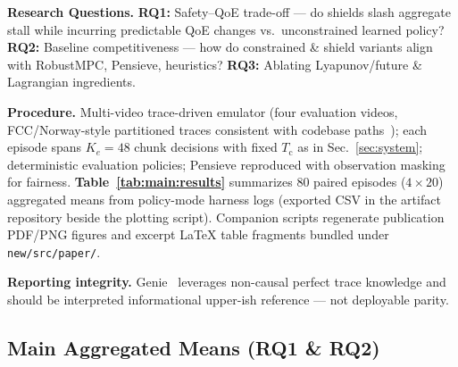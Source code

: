 \documentclass[preprint,12pt]{elsarticle}
\begin{document}
\textbf{Research Questions.}
\textbf{RQ1:} Safety--QoE trade-off --- do shields slash aggregate stall while incurring predictable QoE changes vs.\ unconstrained learned policy?\;
\textbf{RQ2:} Baseline competitiveness --- how do constrained \& shield variants align with RobustMPC, Pensieve, heuristics?
\textbf{RQ3:} Ablating Lyapunov/future \& Lagrangian ingredients.

\textbf{Procedure.} Multi-video trace-driven emulator (four evaluation videos, FCC/Norway-style partitioned traces consistent with codebase paths~\cite{fcc2015mba,kvalbein2014}); each episode spans \(K_e{=}48\) chunk decisions with fixed \(T_{\mathrm{c}}\) as in Sec.~\ref{sec:system}; deterministic evaluation policies; Pensieve reproduced with observation masking for fairness.
\textbf{Table~\ref{tab:main:results}} summarizes 80 paired episodes (\(4\times20\)) aggregated means from policy-mode harness logs (exported CSV in the artifact repository beside the plotting script). Companion scripts regenerate publication PDF/PNG figures and excerpt \LaTeX{} table fragments bundled under \texttt{new/src/paper/}.

\textbf{Reporting integrity.} Genie~\cite{mao2017neural} leverages non-causal perfect trace knowledge and should be interpreted informational upper-ish reference --- not deployable parity.

\subsection*{Main Aggregated Means (RQ1 \& RQ2)}
\begin{table}[ht]
    \caption{Mean session metrics with bootstrap 95\% CIs on episode means (policy mode; $n{=}80$ episodes per method). Cells are formatted as \emph{mean}\,\scriptsize\texttt{[CI]}.}
    \label{tab:main:results}
    \centering
    {\footnotesize
    \resizebox{\textwidth}{!}{}
    }
\end{table}

\begin{table}[ht]
    \caption{Headline paired comparisons on session QoE (Wilcoxon signed-rank; two-sided $p$). Negative median $\Delta$QoE indicates lower QoE than the baseline on paired episodes.}
    \label{tab:wilcoxon:qoe}
    \centering
    {\footnotesize}
\end{table}

\begin{table}[ht]
    \caption{Headline paired stall shifts: median $\Delta$Rebuffer (\%) versus Pensieve \& RobustMPC (same pairing as Table~\ref{tab:wilcoxon:qoe}). Negative $\Delta$ implies fewer stalled seconds per playback-time under the constrained agent.}
    \label{tab:wilcoxon:rb}
    \centering
    {\footnotesize}
\end{table}
\end{document}
